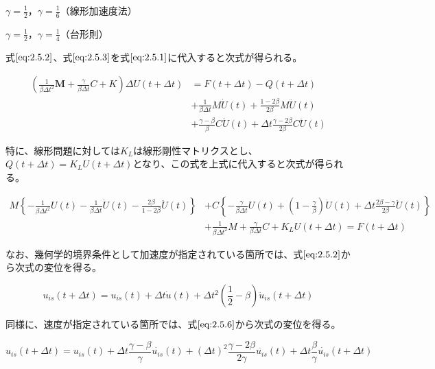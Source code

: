 \documentclass[a4paper,pandoc,ja=standard]{bxjsarticle}
\begin{document}
\(\gamma = \displaystyle \frac{1}{2}\)，\(\gamma = \displaystyle \frac{1}{6}\)（線形加速度法）

\(\gamma = \displaystyle \frac{1}{2}\)，\(\gamma = \displaystyle \frac{1}{4}\)（台形則）

式\(\eqref{eq:2.5.2}\)、式\(\eqref{eq:2.5.3}\)を式\(\eqref{eq:2.5.1}\)に代入すると次式が得られる。

\begin{align}
\nonumber \left( \frac{1}{\beta \Delta t^2} \mathbf{M} + \frac{\gamma}{\beta \Delta t} C + K \right) \Delta U ( t + \Delta t ) &= F ( t + \Delta t )
- Q ( t + \Delta t ) \\\
\nonumber &+ \frac{1}{\beta \Delta t} M \dot{U} ( t )
           + \frac{1 - 2\beta}{2\beta} M \ddot{U} ( t ) \\\
&+ \frac{\gamma - \beta}{\beta} C \dot{U} (t)
           + \Delta t \frac{\gamma - 2\beta}{2 \beta} C \ddot{U}(t)
\label{eq:2.5.4}
\end{align}

特に、線形問題に対しては\(K_L\)は線形剛性マトリクスとし、\(Q ( t + \Delta t ) = K_L U (t + \Delta t)\)となり、この式を上式に代入すると次式が得られる。

\begin{align}
\nonumber M \left\lbrace -\frac{1}{\beta \Delta t^2} U(t) -\frac{1}{\beta \Delta t}\dot U(t) - \frac{2\beta}{1-2\beta} \ddot U(t) \right\rbrace
&+ C\left\lbrace - \frac{\gamma}{\beta \Delta t} U(t) + \left(1 - \frac{\gamma}{\beta}\right) \dot U(t) + \Delta{t}\frac{ 2\beta-\gamma}{2\beta}\ddot U(t)\right\rbrace \\\
 & + \frac{1}{\beta \Delta{t}^2} M + \frac{\gamma}{\beta \Delta{t}} C + K_L U(t+\Delta{t}) = F(t+\Delta{t})
\label{eq:2.5.5}
\end{align}

なお、幾何学的境界条件として加速度が指定されている箇所では、式\(\eqref{eq:2.5.2}\)から次式の変位を得る。

\begin{equation}
u_{is} (t+\Delta{t}) = u_{is} (t) + \Delta t \dot{u}(t) + \Delta t^2 \left(\frac{1}{2} -\beta \right) {\ddot{u}}_{is} (t + \Delta t)
\label{eq:2.5.6}
\end{equation}

同様に、速度が指定されている箇所では、式\(\eqref{eq:2.5.6}\)から次式の変位を得る。

\begin{equation}
u_{is}(t+\Delta{t})= u_{is}(t)+\Delta t
\frac{ \gamma - \beta}{ \gamma}\dot{u_{is}}(t)
+(\Delta{t})^2 \frac{ \gamma - 2\beta}{ 2\gamma}
\ddot{u_{is}}(t)
+\Delta t \frac{\beta}{ \gamma}\dot{u_{is}}(t+\Delta{t})
\label{eq:2.5.7}
\end{equation}
\end{document}
